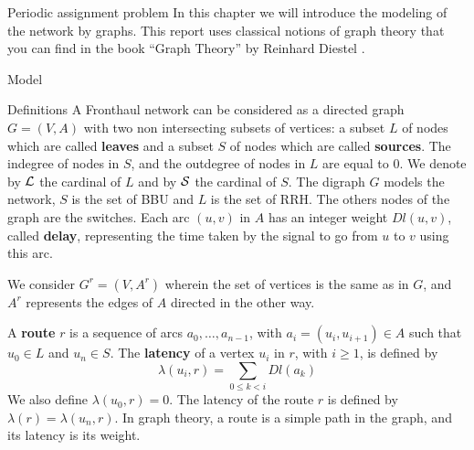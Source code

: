 \documentclass[a4paper,10pt]{report}
\begin{document}
\begin{chapter}{Periodic assignment problem}
 In this chapter we will introduce the modeling of the network by graphs. This report uses classical notions of graph theory that you can find in the book ``Graph Theory'' by Reinhard Diestel \cite{diestel2005graph}.
 \begin{section}{Model}
 \begin{subsection}{Definitions}
  A Fronthaul network can be considered as a directed graph $G=(V,A)$ with two non intersecting subsets of vertices: 
  a subset $L$ of nodes which are called {\bf leaves} and a subset $S$ of nodes which are called {\bf sources}.  
The indegree of nodes in $S$, and the outdegree of nodes in $L$ are equal to 0. 
We denote by ${\cal L}$ the cardinal of $L$ and by ${\cal S}$ the cardinal of $S$. The digraph $G$ models the network,
$S$ is the set of BBU and $L$ is the set of RRH. The others nodes of the graph are the switches.
Each arc  $(u,v)$ in $A$ has an integer weight $Dl(u,v)$, called {\bf delay}, representing the time taken by the signal to go from $u$ to $v$
 using this arc.

We consider $G^r=(V,A^r)$ wherein the set of vertices is the same as in $G$, and $A^r$ represents the edges of $A$ directed in the other way. 
\newline
\begin{center}
\end{center}

A {\bf route} $r$ is a sequence of arcs $a_0, \ldots , a_{n-1}$, with $a_i=(u_i,u_{i+1}) \in A$ such that $u_0 \in L$ and $u_n \in S$.
The {\bf latency} of a vertex $u_i$ in $r$, with $i \geq 1$, is defined by $$\lambda(u_i,r)= \sum\limits_{0 \leq k <i} Dl(a_k)$$ We also define $\lambda(u_0,r)=0$.
The latency of the route $r$ is defined by $\lambda (r)= \lambda (u_n,r)$. In graph theory, a route is a simple path in the graph, and its latency is its weight. 



\end{subsection}
\end{section}
\end{chapter}
\end{document}
